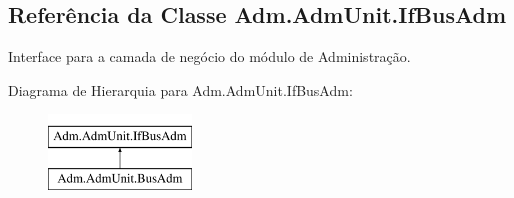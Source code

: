 \hypertarget{classAdm_1_1AdmUnit_1_1IfBusAdm}{}\subsection{Referência da Classe Adm.\+Adm\+Unit.\+If\+Bus\+Adm}
\label{classAdm_1_1AdmUnit_1_1IfBusAdm}


Interface para a camada de negócio do módulo de Administração.  


Diagrama de Hierarquia para Adm.\+Adm\+Unit.\+If\+Bus\+Adm\+:\begin{figure}[H]
\begin{center}
\leavevmode
\includegraphics[height=2.000000cm]{d3/d53/classAdm_1_1AdmUnit_1_1IfBusAdm}
\end{center}
\end{figure}
